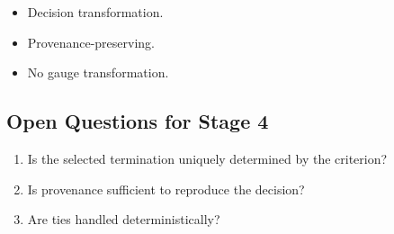 \begin{itemize}
\item Decision transformation.
\item Provenance-preserving.
\item No gauge transformation.
\end{itemize}

\subsection{Open Questions for Stage 4}

\begin{enumerate}
\item Is the selected termination uniquely determined by the criterion?
\item Is provenance sufficient to reproduce the decision?
\item Are ties handled deterministically?
\end{enumerate}
